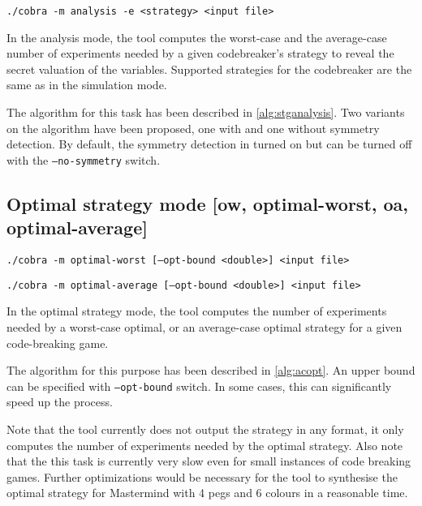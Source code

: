 \centerline{\texttt{./cobra -m analysis -e <strategy> <input file> }}

In the analysis mode, the tool computes
  the worst-case and
  the average-case number of experiments needed by
  a given codebreaker's strategy
  to reveal the secret valuation of the variables.
Supported strategies for the codebreaker are the same as in the simulation mode.

The algorithm for this task has been described in \autoref{alg:stganalysis}.
Two variants on the algorithm have been proposed,
  one with and one without symmetry detection.
By default, the symmetry detection in turned on
  but can be turned off with the \texttt{--no-symmetry} switch.

\subsection{Optimal strategy mode [ow, optimal-worst, oa, optimal-average]}

\centerline{\texttt{./cobra -m optimal-worst [--opt-bound <double>] <input file> }}
\centerline{\texttt{./cobra -m optimal-average [--opt-bound <double>] <input file> }}

In the optimal strategy mode, the tool computes the number
  of experiments needed by a worst-case optimal,
  or an average-case optimal strategy for a given code-breaking game.

The algorithm for this purpose has been described in \autoref{alg:acopt}.
An upper bound can be specified with \texttt{--opt-bound} switch.
In some cases, this can significantly speed up the process.

Note that the tool currently does not output the strategy in any format,
  it only computes the number of experiments needed by the optimal strategy.
Also note that the this task is currently very slow even for
  small instances of code breaking games.
Further optimizations would be necessary for the tool to synthesise the optimal
  strategy for Mastermind with 4 pegs and 6 colours in a reasonable time.
